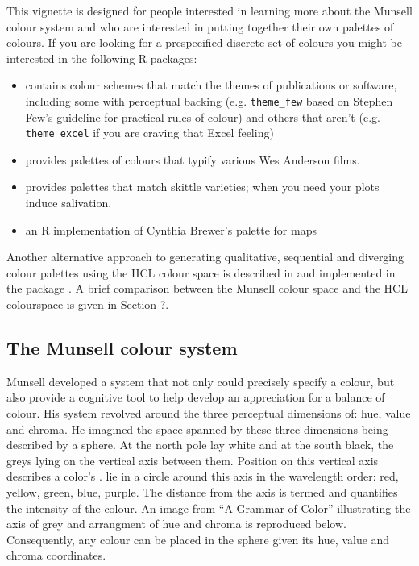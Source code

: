 This vignette is designed for people interested in learning more about
the Munsell colour system and who are interested in putting together
their own palettes of colours. If you are looking for a prespecified
discrete set of colours you might be interested in the following R
packages:

\begin{itemize}
\item
   \citep{Arnold:2014aa} contains colour schemes that
  match the themes of publications or software, including some with
  perceptual backing (e.g. \texttt{theme\_few} based on Stephen Few's
  guideline for practical rules of colour) and others that aren't (e.g.
  \texttt{theme\_excel} if you are craving that Excel feeling)
\item
   \citep{Ram:2014aa} provides palettes of colours
  that typify various Wes Anderson films.
\item
   \citep{Frazee:2014aa} provides palettes that
  match skittle varieties; when you need your plots induce salivation.
\item
   \citep{Neuwirth:2011aa} an R implementation of
  Cynthia Brewer's palette for maps
\end{itemize}

Another alternative approach to generating qualitative, sequential and
diverging colour palettes using the HCL colour space is described in
\citet{Zeileis:2009aa} and implemented in the 
package \citep{Ross-Ihaka:2013aa}. A brief comparison between the
Munsell colour space and the HCL colourspace is given in Section ?.

\subsection{The Munsell colour system}\label{the-munsell-colour-system}

Munsell developed a system that not only could precisely specify a
colour, but also provide a cognitive tool to help develop an
appreciation for a balance of colour. His system revolved around the
three perceptual dimensions of: hue, value and chroma. He imagined the
space spanned by these three dimensions being described by a sphere. At
the north pole lay white and at the south black, the greys lying on the
vertical axis between them. Position on this vertical axis describes a
color's .  lie in a circle around this axis in the
wavelength order: red, yellow, green, blue, purple. The distance from
the axis is termed  and quantifies the intensity of the
colour. An image from ``A Grammar of Color'' \citep{Munsell:1921aa}
illustrating the axis of grey and arrangment of hue and chroma is
reproduced below. Consequently, any colour can be placed in the sphere
given its hue, value and chroma coordinates.

